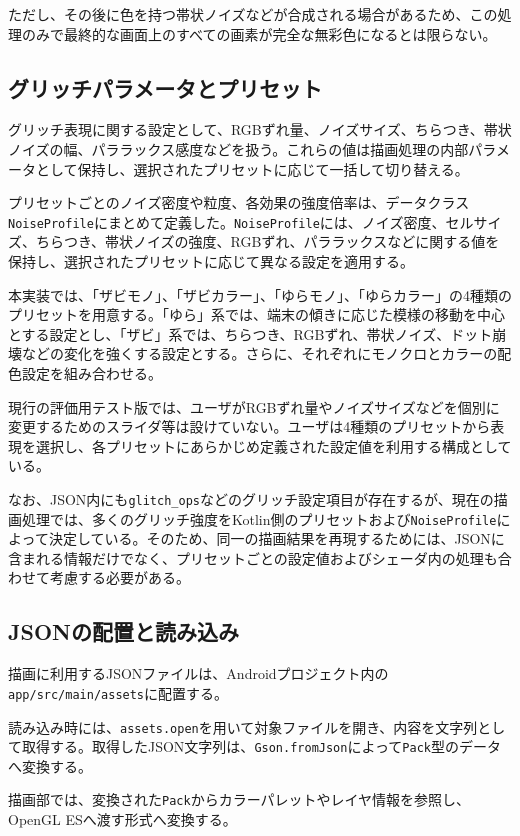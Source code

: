 ただし、その後に色を持つ帯状ノイズなどが合成される場合があるため、この処理のみで最終的な画面上のすべての画素が完全な無彩色になるとは限らない。


\subsection{グリッチパラメータとプリセット}

グリッチ表現に関する設定として、RGBずれ量、ノイズサイズ、ちらつき、帯状ノイズの幅、パララックス感度などを扱う。これらの値は描画処理の内部パラメータとして保持し、選択されたプリセットに応じて一括して切り替える。

プリセットごとのノイズ密度や粒度、各効果の強度倍率は、データクラス\texttt{NoiseProfile}にまとめて定義した。\texttt{NoiseProfile}には、ノイズ密度、セルサイズ、ちらつき、帯状ノイズの強度、RGBずれ、パララックスなどに関する値を保持し、選択されたプリセットに応じて異なる設定を適用する。

本実装では、「ザビモノ」、「ザビカラー」、「ゆらモノ」、「ゆらカラー」の4種類のプリセットを用意する。「ゆら」系では、端末の傾きに応じた模様の移動を中心とする設定とし、「ザビ」系では、ちらつき、RGBずれ、帯状ノイズ、ドット崩壊などの変化を強くする設定とする。さらに、それぞれにモノクロとカラーの配色設定を組み合わせる。

現行の評価用テスト版では、ユーザがRGBずれ量やノイズサイズなどを個別に変更するためのスライダ等は設けていない。ユーザは4種類のプリセットから表現を選択し、各プリセットにあらかじめ定義された設定値を利用する構成としている。

なお、JSON内にも\texttt{glitch\_ops}などのグリッチ設定項目が存在するが、現在の描画処理では、多くのグリッチ強度をKotlin側のプリセットおよび\texttt{NoiseProfile}によって決定している。そのため、同一の描画結果を再現するためには、JSONに含まれる情報だけでなく、プリセットごとの設定値およびシェーダ内の処理も合わせて考慮する必要がある。


\subsection{JSONの配置と読み込み}

描画に利用するJSONファイルは、Androidプロジェクト内の\texttt{app/src/main/assets}に配置する。

読み込み時には、\texttt{assets.open}を用いて対象ファイルを開き、内容を文字列として取得する。取得したJSON文字列は、\texttt{Gson.fromJson}によって\texttt{Pack}型のデータへ変換する。

描画部では、変換された\texttt{Pack}からカラーパレットやレイヤ情報を参照し、OpenGL ESへ渡す形式へ変換する。

